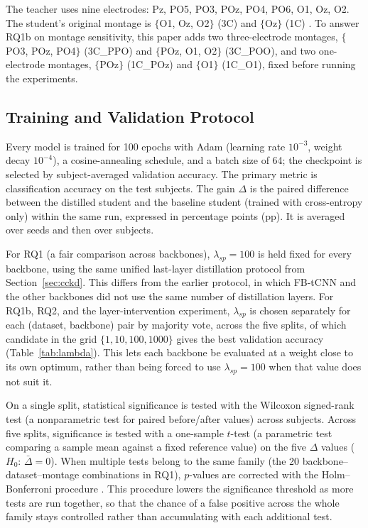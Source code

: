 \documentclass[11pt,a4paper,twoside,asymmetric]{article}
\begin{document}
The teacher uses nine electrodes: Pz, PO5, PO3, POz, PO4, PO6, O1, Oz, O2. The student's original montage is $\{$O1, Oz, O2$\}$ (3C) and $\{$Oz$\}$ (1C) \cite{R82}. To answer RQ1b on montage sensitivity, this paper adds two three-electrode montages, $\{$PO3, POz, PO4$\}$ (3C\_PPO) and $\{$POz, O1, O2$\}$ (3C\_POO), and two one-electrode montages, $\{$POz$\}$ (1C\_POz) and $\{$O1$\}$ (1C\_O1), fixed before running the experiments.

\subsection{Training and Validation Protocol}
\label{sec:setup}

Every model is trained for 100 epochs with Adam (learning rate $10^{-3}$, weight decay $10^{-4}$), a cosine-annealing schedule, and a batch size of 64; the checkpoint is selected by subject-averaged validation accuracy. The primary metric is classification accuracy on the test subjects. The gain $\Delta$ is the paired difference between the distilled student and the baseline student (trained with cross-entropy only) within the same run, expressed in percentage points (pp). It is averaged over seeds and then over subjects.

For RQ1 (a fair comparison across backbones), $\lambda_{sp}=100$ is held fixed for every backbone, using the same unified last-layer distillation protocol from Section~\ref{sec:cckd}. This differs from the earlier protocol, in which FB-tCNN and the other backbones did not use the same number of distillation layers. For RQ1b, RQ2, and the layer-intervention experiment, $\lambda_{sp}$ is chosen separately for each (dataset, backbone) pair by majority vote, across the five splits, of which candidate in the grid $\{1, 10, 100, 1000\}$ gives the best validation accuracy (Table~\ref{tab:lambda}). This lets each backbone be evaluated at a weight close to its own optimum, rather than being forced to use $\lambda_{sp}=100$ when that value does not suit it.

On a single split, statistical significance is tested with the Wilcoxon signed-rank test (a nonparametric test for paired before/after values) across subjects. Across five splits, significance is tested with a one-sample $t$-test (a parametric test comparing a sample mean against a fixed reference value) on the five $\Delta$ values ($H_0$: $\bar\Delta = 0$). When multiple tests belong to the same family (the 20 backbone--dataset--montage combinations in RQ1), $p$-values are corrected with the Holm--Bonferroni procedure \cite{R86}. This procedure lowers the significance threshold as more tests are run together, so that the chance of a false positive across the whole family stays controlled rather than accumulating with each additional test.
\end{document}
